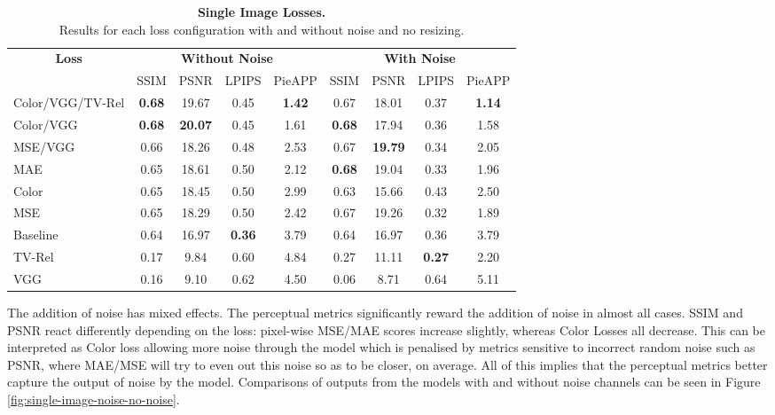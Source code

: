 \begin{table}
    \centering
    \captionsetup{justification=centering}
    \caption{
        \textbf{Single Image Losses.} \\Results for each loss configuration with and without noise and no resizing.
    }
    \setlength{\tabcolsep}{0.3em}
    \begin{tabular}{l|cccc|cccc}
        \toprule
        \multicolumn{1}{c}{\textbf{Loss}}& \multicolumn{4}{c}{\textbf{Without Noise}} & \multicolumn{4}{c}{\textbf{With Noise}}\\
        \multicolumn{1}{c}{} & SSIM & PSNR & LPIPS & \multicolumn{1}{c}{PieAPP} & SSIM & PSNR & LPIPS & PieAPP \\
        \midrule
        Color/VGG/TV-Rel & \textbf{0.68} & 19.67 & 0.45 & \textbf{1.42} & 0.67 & 18.01 & 0.37 & \textbf{1.14} \\
        Color/VGG & \textbf{0.68} & \textbf{20.07} & 0.45 & 1.61 & \textbf{0.68} & 17.94 & 0.36 & 1.58 \\
        MSE/VGG & 0.66 & 18.26 & 0.48 & 2.53 & 0.67 & \textbf{19.79} & 0.34 & 2.05 \\
        MAE & 0.65 & 18.61 & 0.50 & 2.12 & \textbf{0.68} & 19.04 & 0.33 & 1.96 \\
        Color & 0.65 & 18.45 & 0.50 & 2.99 & 0.63 & 15.66 & 0.43 & 2.50 \\
        MSE & 0.65 & 18.29 & 0.50 & 2.42 & 0.67 & 19.26 & 0.32 & 1.89 \\
        Baseline & 0.64 & 16.97 & \textbf{0.36} & 3.79 & 0.64 & 16.97 & 0.36 & 3.79 \\
        \midrule
        TV-Rel & 0.17 & 9.84 & 0.60 & 4.84 & 0.27 & 11.11 & \textbf{0.27} & 2.20 \\
        VGG & 0.16 & 9.10 & 0.62 & 4.50 & 0.06 & 8.71 & 0.64 & 5.11 \\
        \bottomrule
    \end{tabular}
    
    \label{tab:single-image-losses}
\end{table}


The addition of noise has mixed effects. The perceptual metrics significantly reward the addition of noise in almost all cases. SSIM and PSNR react differently depending on the loss: pixel-wise MSE/MAE scores increase slightly, whereas Color Losses all decrease. This can be interpreted as Color loss allowing more noise through the model which is penalised by metrics sensitive to incorrect random noise such as PSNR, where MAE/MSE will try to even out this noise so as to be closer, on average. All of this implies that the perceptual metrics better capture the output of noise by the model. Comparisons of outputs from the models with and without noise channels can be seen in Figure \ref{fig:single-image-noise-no-noise}.


